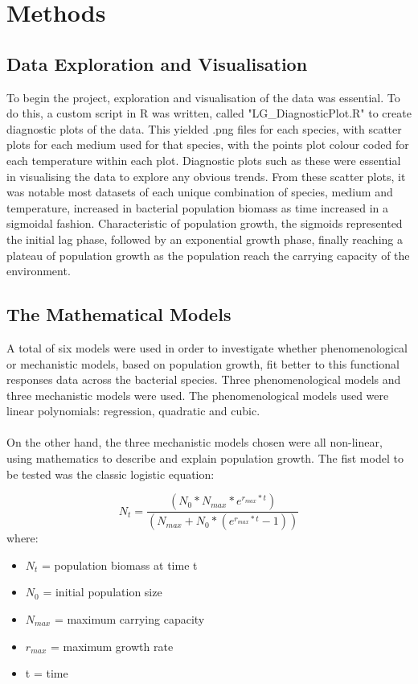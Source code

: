 \documentclass[11pt, a4paper]{article} %
\begin{document}
\section{Methods}

\subsection{Data Exploration and Visualisation}

To begin the project, exploration and visualisation of the data was essential. To do this, a custom script in R was written, called "LG\_DiagnosticPlot.R" to create diagnostic plots of the data. This yielded .png files for each species, with scatter plots for each medium used for that species, with the points plot colour coded for each temperature within each plot. Diagnostic plots such as these were essential in visualising the data to explore any obvious trends. From these scatter plots, it was notable most datasets of each unique combination of species, medium and temperature, increased in bacterial population biomass as time increased in a sigmoidal fashion. Characteristic of population growth, the sigmoids represented the initial lag phase, followed by an exponential growth phase, finally reaching a plateau of population growth as the population reach the carrying capacity of the environment.

\subsection{The Mathematical Models}

A total of six models were used in order to investigate whether phenomenological or mechanistic models, based on population growth, fit better to this functional responses data across the bacterial species. Three phenomenological models and three mechanistic models were used. The phenomenological models used were linear polynomials: regression, quadratic and cubic.
\paragraph{} On the other hand, the three mechanistic models chosen were all non-linear, using mathematics to describe and explain population growth. The fist model to be tested was the classic logistic equation:

\begin{equation}
N_t = \frac{(N_0 * N_{max} * e^{r_{max} * t})} {(N_{max} + N_0 * (e^{r_{max} * t} - 1))}
\label{eqn:logistic}
\end{equation}
where:
\begin{itemize}
\item $N_t$ = population biomass at time t
\item $N_0$ = initial population size
\item $N_{max}$ = maximum carrying capacity
\item $r_{max}$ = maximum growth rate
\item t = time
\end{itemize}
\end{document}
